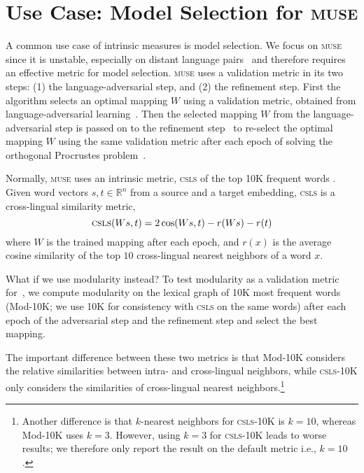 \section{Use Case: Model Selection for \textsc{muse}}
\label{sec:validation}

A common use case of intrinsic measures is model selection.
We focus on \textsc{muse}~\cite{lample2018word} since it is unstable,
especially on distant language
pairs~\cite{self_learn,eigenval_sim,non_adv} and therefore requires an
effective metric for model selection.
\textsc{muse} uses a validation metric in its two steps: (1) the language-adversarial step, and (2) the refinement step.
First the algorithm selects an optimal mapping $W$ using a validation metric, obtained from language-adversarial learning~\cite{ganin}.
Then the selected mapping $W$ from the language-adversarial step is passed on to the refinement step~\citep{artetxe-labaka-agirre:2017:Long} to re-select the optimal mapping $W$ using the same validation metric after each epoch of solving the orthogonal Procrustes problem~\citep{Schonemann1966}.

Normally, \textsc{muse} uses an intrinsic metric, \textsc{csls} of the top 10K frequent words \cite[\textsc{csls}-10K]{lample2018word}.  Given word vectors $s, t \in \mathbb{R}^n$ from a source and a target embedding, \textsc{csls} is a cross-lingual similarity metric,
\begin{equation}
\text{\textsc{csls}}(W s, t) = 2 \cos(W s, t) - r(W s) - r(t)
\end{equation}
where $W$ is the trained mapping after each epoch, and $r(x)$ is the average cosine similarity of the top $10$ cross-lingual nearest neighbors of a word $x$.


What if we use modularity instead?
To test modularity as a validation metric for~, we
compute modularity on the lexical graph of 10K most frequent words
(Mod-10K; we use 10K for consistency with \textsc{csls} on the same
words) after each epoch of the adversarial step and the refinement step and select the best mapping.

The important difference between these two metrics is that Mod-10K
considers the relative similarities between intra- and cross-lingual
neighbors, while \textsc{csls}-10K only considers the similarities of
cross-lingual nearest neighbors.\footnote{Another difference is that
  $k$-nearest neighbors for \textsc{csls}-10K is $k=10$, whereas
  Mod-10K uses $k=3$. However, using $k=3$ for \textsc{csls}-10K leads
  to worse results; we therefore only report the result on the
  default metric i.e., $k=10$.}

